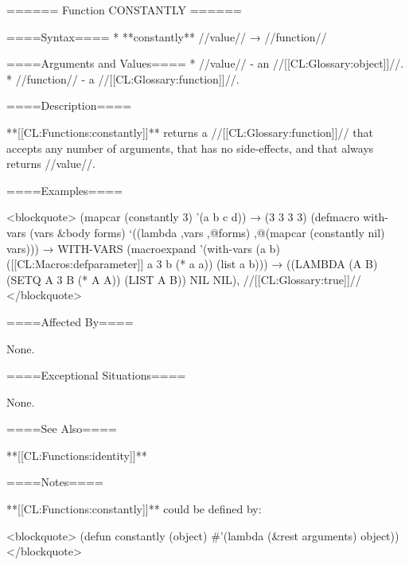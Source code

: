 ====== Function CONSTANTLY ======

====Syntax====
  * **constantly** //value// → //function//

====Arguments and Values====
  * //value// - an //[[CL:Glossary:object]]//.
  * //function// - a //[[CL:Glossary:function]]//.

====Description====

**[[CL:Functions:constantly]]** returns a //[[CL:Glossary:function]]// that accepts any number of arguments, that has no side-effects, and that always returns //value//.

====Examples====

<blockquote> (mapcar (constantly 3) '(a b c d)) → (3 3 3 3) (defmacro with-vars (vars &body forms) `((lambda ,vars ,@forms) ,@(mapcar (constantly nil) vars))) → WITH-VARS (macroexpand '(with-vars (a b) ([[CL:Macros:defparameter]] a 3 b (* a a)) (list a b))) → ((LAMBDA (A B) (SETQ A 3 B (* A A)) (LIST A B)) NIL NIL), //[[CL:Glossary:true]]// </blockquote>

====Affected By====

None.

====Exceptional Situations====

None.

====See Also====

**[[CL:Functions:identity]]**

====Notes====

**[[CL:Functions:constantly]]** could be defined by:

<blockquote> (defun constantly (object) #'(lambda (&rest arguments) object)) </blockquote>



